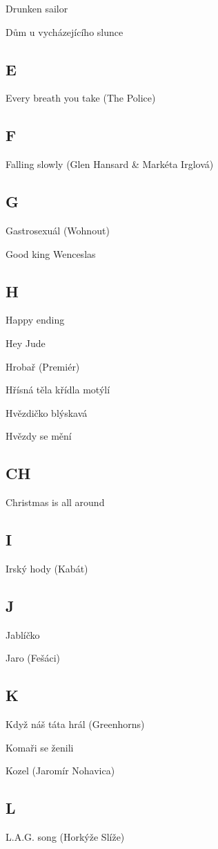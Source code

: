 \begin{multicols}{2}
Drunken sailor

Dům u vycházejícího slunce

\subsection*{E}
Every breath you take (The Police)

\subsection*{F}
Falling slowly (Glen Hansard \& Markéta Irglová)

\subsection*{G}
Gastrosexuál (Wohnout)

Good king Wenceslas

\subsection*{H}
Happy ending

Hey Jude

Hrobař (Premiér)

Hřísná těla křídla motýlí

Hvězdičko blýskavá

Hvězdy se mění

\subsection*{CH}
Christmas is all around

\subsection*{I}
Irský hody (Kabát)

\subsection*{J}
Jablíčko

Jaro (Fešáci)

\subsection*{K}
Když náš táta hrál (Greenhorns)

Komaři se ženili

Kozel (Jaromír Nohavica)

\subsection*{L}
L.A.G. song (Horkýže Slíže)


\end{multicols}
